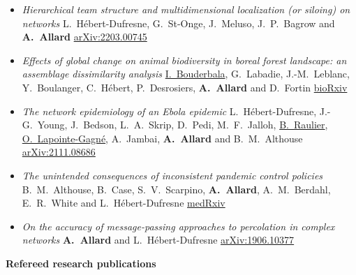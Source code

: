 \documentclass[11pt]{article}
\begin{document}
\begin{itemize}[itemsep=0.5em]
  \item \textit{Hierarchical team structure and multidimensional localization (or siloing) on networks}\split
  L.~Hébert-Dufresne, G.~St-Onge, J.~Meluso, J.~P.~Bagrow and \textbf{A.~Allard}\split
  \href{https://arxiv.org/abs/2203.00745}{arXiv:2203.00745}
%
  \item \textit{Effects of global change on animal biodiversity in boreal forest landscape: an assemblage dissimilarity analysis}\split
  \uline{I.~Bouderbala}, G.~Labadie, J.-M.~Leblanc, Y.~Boulanger, C.~Hébert, P.~Desrosiers, \textbf{A.~Allard} and D.~Fortin\split
  \href{https://doi.org/10.1101/2022.01.31.477297}{bioRxiv}
%
  \item \textit{The network epidemiology of an Ebola epidemic}\split
  L.~Hébert-Dufresne, J.-G.~Young, J.~Bedson, L.~A.~Skrip, D.~Pedi, M.~F.~Jalloh, \uline{B.~Raulier}, \uline{O.~Lapointe-Gagné}, A.~Jambai, \textbf{A.~Allard} and B.~M.~Althouse\split
  \href{https://arxiv.org/abs/2111.08686}{arXiv:2111.08686}
%
  \item \textit{The unintended consequences of inconsistent pandemic control policies}\split
  B.~M.~Althouse, B.~Case, S.~V.~Scarpino, \textbf{A.~Allard}, A.~M.~Berdahl, E.~R.~White and L.~Hébert-Dufresne\split
  \href{https://doi.org/10.1101/2020.08.21.20179473}{medRxiv}
%
  \item \textit{On the accuracy of message-passing approaches to percolation in complex networks}\split
  \textbf{A.~Allard} and L.~H\'ebert-Dufresne\split
  \href{https://arxiv.org/abs/1906.10377}{arXiv:1906.10377}
%
\end{itemize}
%
%
%
\pagebreak
\textbf{Refereed research publications}
%
\end{document}
